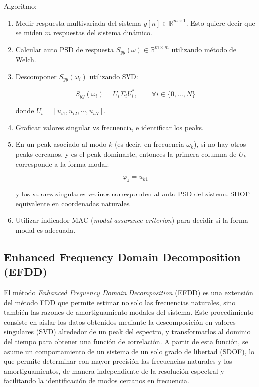 Algoritmo:

\begin{enumerate}
    \item Medir respuesta multivariada del sistema $y[n] \in \mathbb{R}^{m \times 1}$. Esto quiere decir que se miden $m$ respuestas del sistema dinámico.
    \item Calcular auto PSD de respuesta $S_{yy}(\omega) \in \mathbb{R}^{m \times m}$ utilizando método de Welch.
    \item Descomponer $S_{yy}(\omega_i)$ utilizando SVD:

        \begin{equation}
            S_{yy}(\omega_i) = U_i \Sigma_i U_i^*, \qquad \forall i\in\{0,\ldots,N\}
        \end{equation}

    donde $U_i = [u_{i1}, u_{i2}, \cdots, u_{iN}]$.
    
    \item Graficar valores singular vs frecuencia, e identificar los peaks.
    \item En un peak asociado al modo $k$ (es decir, en frecuencia $\omega_k$), si no hay otros peaks cercanos, y es el peak dominante, entonces la primera columna de $U_k$ corresponde a la forma modal:

        \begin{equation}
            \varphi_k = u_{k1}
        \end{equation}
    
    y los valores singulares vecinos corresponden al auto PSD del sistema SDOF equivalente en coordenadas naturales.
    \item Utilizar indicador MAC (\emph{modal assurance criterion}) para decidir si la forma modal es adecuada. 
\end{enumerate}

\subsection{Enhanced Frequency Domain Decomposition (EFDD)}

El método \emph{Enhanced Frequency Domain Decomposition} (EFDD) es una extensión del método FDD que permite estimar no solo las frecuencias naturales, sino también las razones de amortiguamiento modales del sistema. Este procedimiento consiste en aislar los datos obtenidos mediante la descomposición en valores singulares (SVD) alrededor de un peak del espectro, y transformarlos al dominio del tiempo para obtener una función de correlación. A partir de esta función, se asume un comportamiento de un sistema de un solo grado de libertad (SDOF), lo que permite determinar con mayor precisión las frecuencias naturales y los amortiguamientos, de manera independiente de la resolución espectral y facilitando la identificación de modos cercanos en frecuencia.

